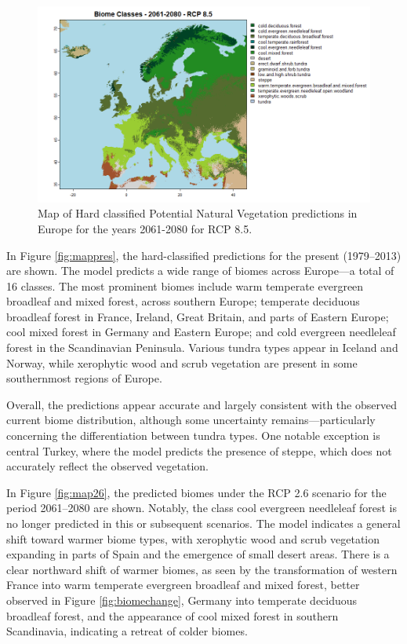 \documentclass[
]{krantz}
\begin{document}
\begin{figure}

{\centering \includegraphics[width=1\linewidth]{work/05-naturalveg/figures/eu_pred_85_2c} 

}

\caption{Map of Hard classified Potential Natural Vegetation  predictions in Europe for the years 2061-2080 for RCP 8.5.}\label{fig:map85}
\end{figure}

In Figure \ref{fig:mappres}, the hard-classified predictions for the present (1979--2013) are shown. The model predicts a wide range of biomes across Europe---a total of 16 classes. The most prominent biomes include warm temperate evergreen broadleaf and mixed forest, across southern Europe; temperate deciduous broadleaf forest in France, Ireland, Great Britain, and parts of Eastern Europe; cool mixed forest in Germany and Eastern Europe; and cold evergreen needleleaf forest in the Scandinavian Peninsula. Various tundra types appear in Iceland and Norway, while xerophytic wood and scrub vegetation are present in some southernmost regions of Europe.

Overall, the predictions appear accurate and largely consistent with the observed current biome distribution, although some uncertainty remains---particularly concerning the differentiation between tundra types. One notable exception is central Turkey, where the model predicts the presence of steppe, which does not accurately reflect the observed vegetation.

In Figure \ref{fig:map26}, the predicted biomes under the RCP 2.6 scenario for the period 2061--2080 are shown. Notably, the class cool evergreen needleleaf forest is no longer predicted in this or subsequent scenarios. The model indicates a general shift toward warmer biome types, with xerophytic wood and scrub vegetation expanding in parts of Spain and the emergence of small desert areas. There is a clear northward shift of warmer biomes, as seen by the transformation of western France into warm temperate evergreen broadleaf and mixed forest, better observed in Figure \ref{fig:biomechange}, Germany into temperate deciduous broadleaf forest, and the appearance of cool mixed forest in southern Scandinavia, indicating a retreat of colder biomes.
\end{document}
